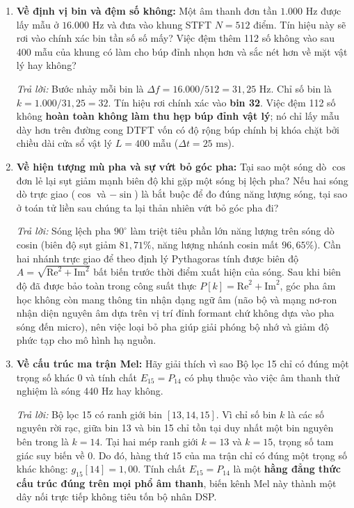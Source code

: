 \documentclass[11pt,a4paper]{article}
\begin{document}
\begin{enumerate}
    \item \textbf{Về định vị bin và đệm số không:} Một âm thanh đơn tần $1.000\text{ Hz}$ được lấy mẫu ở $16.000\text{ Hz}$ và đưa vào khung STFT $N = 512$ điểm. Tín hiệu này sẽ rơi vào chính xác bin tần số số mấy? Việc đệm thêm 112 số không vào sau 400 mẫu của khung có làm cho búp đỉnh nhọn hơn và sắc nét hơn về mặt vật lý hay không?
    
    \textit{Trả lời:} Bước nhảy mỗi bin là $\Delta f = 16.000 / 512 = 31{,}25\text{ Hz}$. Chỉ số bin là $k = 1.000 / 31{,}25 = 32$. Tín hiệu rơi chính xác vào \textbf{bin 32}. Việc đệm 112 số không \textbf{hoàn toàn không làm thu hẹp búp đỉnh vật lý}; nó chỉ lấy mẫu dày hơn trên đường cong DTFT vốn có độ rộng búp chính bị khóa chặt bởi chiều dài cửa sổ vật lý $L = 400$ mẫu ($\Delta t = 25\text{ ms}$).

    \item \textbf{Về hiện tượng mù pha và sự vứt bỏ góc pha:} Tại sao một sóng dò $\cos$ đơn lẻ lại sụt giảm mạnh biên độ khi gặp một sóng bị lệch pha? Nếu hai sóng dò trực giao ($\cos$ và $-\sin$) là bắt buộc để đo đúng năng lượng sóng, tại sao ở toán tử liền sau chúng ta lại thản nhiên vứt bỏ góc pha đi?
    
    \textit{Trả lời:} Sóng lệch pha $90^\circ$ làm triệt tiêu phần lớn năng lượng trên sóng dò cosin (biên độ sụt giảm $81{,}71\%$, năng lượng nhánh cosin mất $96{,}65\%$). Cần hai nhánh trực giao để theo định lý Pythagoras tính được biên độ $A = \sqrt{\text{Re}^2 + \text{Im}^2}$ bất biến trước thời điểm xuất hiện của sóng. Sau khi biên độ đã được bảo toàn trong công suất thực $P[k] = \text{Re}^2 + \text{Im}^2$, góc pha âm học không còn mang thông tin nhận dạng ngữ âm (não bộ và mạng nơ-ron nhận diện nguyên âm dựa trên vị trí đỉnh formant chứ không dựa vào pha sóng đến micro), nên việc loại bỏ pha giúp giải phóng bộ nhớ và giảm độ phức tạp cho mô hình hạ nguồn.

    \item \textbf{Về cấu trúc ma trận Mel:} Hãy giải thích vì sao Bộ lọc 15 chỉ có đúng một trọng số khác 0 và tính chất $E_{15} = P_{14}$ có phụ thuộc vào việc âm thanh thử nghiệm là sóng 440 Hz hay không.
    
    \textit{Trả lời:} Bộ lọc 15 có ranh giới bin $[13, 14, 15]$. Vì chỉ số bin $k$ là các số nguyên rời rạc, giữa bin 13 và bin 15 chỉ tồn tại duy nhất một bin nguyên bên trong là $k = 14$. Tại hai mép ranh giới $k=13$ và $k=15$, trọng số tam giác suy biến về 0. Do đó, hàng thứ 15 của ma trận chỉ có đúng một trọng số khác không: $g_{15}[14] = 1{,}00$. Tính chất $E_{15} = P_{14}$ là một \textbf{hằng đẳng thức cấu trúc đúng trên mọi phổ âm thanh}, biến kênh Mel này thành một dây nối trực tiếp không tiêu tốn bộ nhân DSP.
\end{enumerate}
\end{document}
